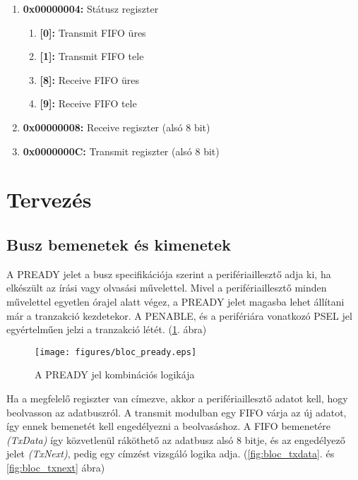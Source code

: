 \begin{enumerate}
\begin{enumerate}
\begin{enumerate}
\end{enumerate}
\item \textbf{0x00000004:} Státusz regiszter
\begin{enumerate}
\item \textbf{[0]:} Transmit FIFO üres
\item \textbf{[1]:} Transmit FIFO tele
\item \textbf{[8]:} Receive FIFO üres
\item \textbf{[9]:} Receive FIFO tele

\end{enumerate}
\item \textbf{0x00000008:} Receive regiszter (alsó 8 bit)
\item \textbf{0x0000000C:} Transmit regiszter (alsó 8 bit)

\end{enumerate}

\end{enumerate}
\newpage
\section{Tervezés}
\subsection{Busz bemenetek és kimenetek}

A PREADY jelet a busz specifikációja szerint a perifériaillesztő adja ki, ha elkészült az írási vagy olvasási művelettel. Mivel a perifériaillesztő minden művelettel egyetlen órajel alatt végez,  a PREADY jelet magasba lehet állítani már a tranzakció kezdetekor. A PENABLE, és a perifériára vonatkozó PSEL jel egyértelműen jelzi a tranzakció létét. (\ref{fig:bloc_pready}. ábra)

\begin{figure}[h]
\vspace{0.5cm}
\begin{center}
\texttt{[image: figures/bloc\_pready.eps]}
\caption{A PREADY jel kombinációs logikája}
\label{fig:bloc_pready}
\end{center}
\vspace{0.5cm}
\end{figure}

Ha a megfelelő regiszter van címezve, akkor a perifériaillesztő adatot kell, hogy beolvasson az adatbuszról. A transmit modulban egy FIFO várja az új adatot, így ennek bemenetét kell engedélyezni a beolvasáshoz. A FIFO bemenetére \textit{(TxData)} így közvetlenül ráköthető az adatbusz alsó 8 bitje, és az engedélyező jelet \textit{(TxNext)}, pedig egy címzést vizsgáló logika adja. (\ref{fig:bloc_txdata}. és \ref{fig:bloc_txnext} ábra)

